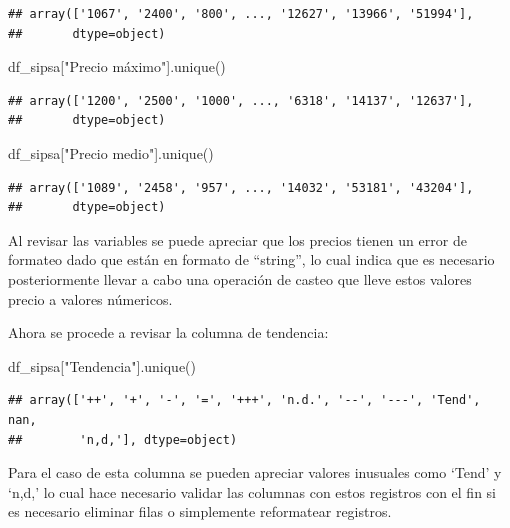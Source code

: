 \documentclass[
]{book}
\newenvironment{Shaded}{\begin{snugshade}}{\end{snugshade}}
\newcommand{\NormalTok}[1]{#1}
\newcommand{\StringTok}[1]{\textcolor[rgb]{0.31,0.60,0.02}{#1}}
\begin{document}
\begin{verbatim}
## array(['1067', '2400', '800', ..., '12627', '13966', '51994'],
##       dtype=object)
\end{verbatim}

\begin{Shaded}
\begin{Highlighting}[]
\NormalTok{df\_sipsa[}\StringTok{"Precio máximo"}\NormalTok{].unique()}
\end{Highlighting}
\end{Shaded}

\begin{verbatim}
## array(['1200', '2500', '1000', ..., '6318', '14137', '12637'],
##       dtype=object)
\end{verbatim}

\begin{Shaded}
\begin{Highlighting}[]
\NormalTok{df\_sipsa[}\StringTok{"Precio medio"}\NormalTok{].unique()}
\end{Highlighting}
\end{Shaded}

\begin{verbatim}
## array(['1089', '2458', '957', ..., '14032', '53181', '43204'],
##       dtype=object)
\end{verbatim}

Al revisar las variables se puede apreciar que los precios tienen un error de formateo dado que están en formato de ``string'', lo cual indica que es necesario posteriormente llevar a cabo una operación de casteo que lleve estos valores precio a valores númericos.

Ahora se procede a revisar la columna de tendencia:

\begin{Shaded}
\begin{Highlighting}[]

\NormalTok{df\_sipsa[}\StringTok{"Tendencia"}\NormalTok{].unique()}
\end{Highlighting}
\end{Shaded}

\begin{verbatim}
## array(['++', '+', '-', '=', '+++', 'n.d.', '--', '---', 'Tend', nan,
##        'n,d,'], dtype=object)
\end{verbatim}

Para el caso de esta columna se pueden apreciar valores inusuales como `Tend' y `n,d,' lo cual hace necesario validar las columnas con estos registros con el fin si es necesario eliminar filas o simplemente reformatear registros.
\end{document}
